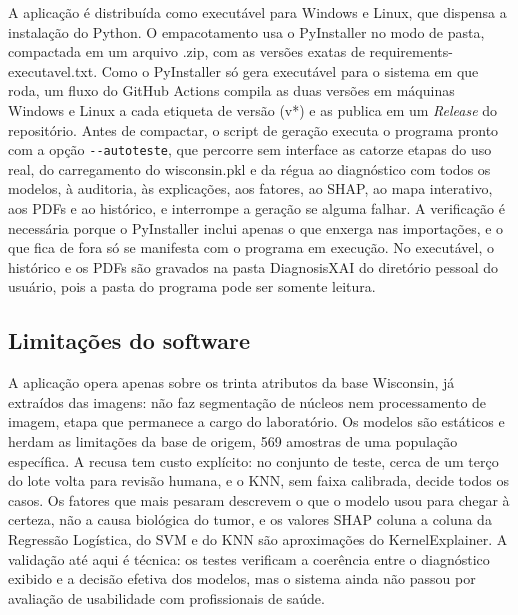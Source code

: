 \documentclass[
    12pt
    ,oneside
    ,a4paper
    ,chapter=TITLE
    ,section=TITLE
    ,sumario=abnt-6027-2012
    ,english,brazil]{abntex2} %
\begin{document}
A aplicação é distribuída como executável para Windows e Linux, que dispensa a
instalação do Python. O empacotamento usa o PyInstaller no modo de pasta,
compactada em um arquivo .zip, com as versões exatas de
requirements-executavel.txt. Como o PyInstaller só gera executável para o
sistema em que roda, um fluxo do GitHub Actions compila as duas versões em
máquinas Windows e Linux a cada etiqueta de versão (v*) e as publica em um
\textit{Release} do repositório. Antes de compactar, o script de geração
executa o programa pronto com a opção \texttt{-}\texttt{-autoteste}, que
percorre sem interface as catorze etapas do uso real, do carregamento do
wisconsin.pkl e da régua ao diagnóstico com todos os modelos, à auditoria, às
explicações, aos fatores, ao SHAP, ao mapa interativo, aos PDFs e ao histórico,
e interrompe a geração se alguma falhar. A verificação é necessária porque o
PyInstaller inclui apenas o que enxerga nas importações, e o que fica de fora só
se manifesta com o programa em execução. No executável, o histórico e os PDFs
são gravados na pasta DiagnosisXAI do diretório pessoal do usuário, pois a
pasta do programa pode ser somente leitura.

\subsection{Limitações do software}
\label{subsec:limitacoes-software}

A aplicação opera apenas sobre os trinta atributos da base Wisconsin, já
extraídos das imagens: não faz segmentação de núcleos nem processamento de
imagem, etapa que permanece a cargo do laboratório. Os modelos são estáticos e
herdam as limitações da base de origem, 569 amostras de uma população
específica. A recusa tem custo explícito: no conjunto de teste, cerca de um
terço do lote volta para revisão humana, e o KNN, sem faixa calibrada, decide
todos os casos. Os fatores que mais pesaram descrevem o que o modelo usou para
chegar à certeza, não a causa biológica do tumor, e os valores SHAP coluna a
coluna da Regressão Logística, do SVM e do KNN são aproximações do
KernelExplainer. A validação até aqui é técnica: os testes verificam a
coerência entre o diagnóstico exibido e a decisão efetiva dos modelos, mas o
sistema ainda não passou por avaliação de usabilidade com profissionais de
saúde.

\end{document}
